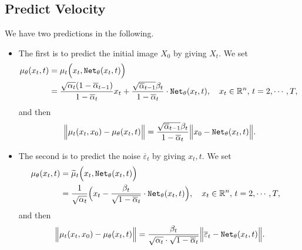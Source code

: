 \documentclass[
]{article}
\theoremstyle{remark}
\begin{document}
\subsection{Predict Velocity}\label{predict-velocity}

We have two predictions in the following.

\begin{itemize}
\item
  The first is to predict the initial image \(X_0\) by giving \(X_t.\)
  We set \[
  \begin{aligned}
    \mu_{\theta}(x_t,t) 
    &= \mu_t \Bigl( x_t, \mathtt{Net}_{\theta}(x_t,t) \Bigr) \cr
    &= \frac{\sqrt{\alpha_t}(1-\overline{\alpha}_{t-1})}{1-\overline{\alpha}_t}x_t + \frac{\sqrt{\overline{\alpha}_{t-1}}\beta_t}{1-\overline{\alpha}_t} \cdot \mathtt{Net}_{\theta}(x_t,t) , \quad x_t \in \mathbb R^n,\, t=2, \cdots, T,
  \end{aligned}
  \] and then \[
  \begin{aligned}
    \Bigl\lVert \mu_t(x_t,x_0)- \mu_{\theta}(x_t,t) \Bigr\rVert 
    = \frac{\sqrt{\overline{\alpha}_{t-1}}\beta_t}{1-\overline{\alpha}_t} \Bigl\lVert  x_0 - \mathtt{Net}_{\theta}(x_t,t) \Bigr\rVert.
  \end{aligned}
  \]
\item
  The second is to predict the noise \(\overline{\varepsilon}_t\) by
  giving \(x_t,t.\) We set \[
  \begin{aligned}
    \mu_{\theta}(x_t,t)
    &= \widetilde{\mu}_t \Bigl( x_t, \mathtt{Net}_{\theta}(x_t,t) \Bigr)  \cr
    &= \frac{1}{\sqrt{\alpha_t}} \Bigl( 
      x_t - \frac{\beta_t}{\sqrt{1-\overline{\alpha}_t}} \cdot \mathtt{Net}_{\theta}(x_t,t)
    \Bigr) , \quad x_t \in \mathbb R^n,\, t=2,\cdots, T,
  \end{aligned}
  \] and then \[
  \begin{aligned}
    \Bigl\lVert \mu_t(x_t,x_0)- \mu_{\theta}(x_t,t) \Bigr\rVert =  \frac{\beta_t}{\sqrt{\alpha_t}\cdot \sqrt{1-\overline{\alpha}_t}} \Bigl\lVert \overline{\varepsilon}_t - \mathtt{Net}_{\theta}(x_t,t)  \Bigr\rVert.
  \end{aligned}
  \]
\end{itemize}
\end{document}
